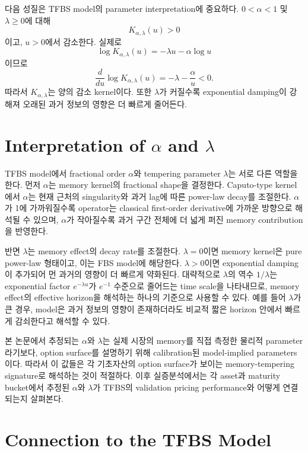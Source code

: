 \documentclass[11pt,a4paper]{report}
\begin{document}
다음 성질은 TFBS model의 parameter interpretation에 중요하다. $0<\alpha<1$ 및 $\lambda\ge0$에 대해
\[
K_{\alpha,\lambda}(u)>0
\]
이고, $u>0$에서 감소한다. 실제로
\[
\log K_{\alpha,\lambda}(u)
=
-\lambda u-\alpha\log u
\]
이므로
\[
\frac{d}{du}\log K_{\alpha,\lambda}(u)
=
-\lambda-\frac{\alpha}{u}<0.
\]
따라서 $K_{\alpha,\lambda}$는 양의 감소 kernel이다. 또한 $\lambda$가 커질수록 exponential damping이 강해져 오래된 과거 정보의 영향은 더 빠르게 줄어든다.

\section{Interpretation of \texorpdfstring{$\alpha$}{alpha} and \texorpdfstring{$\lambda$}{lambda}}

TFBS model에서 fractional order $\alpha$와 tempering parameter $\lambda$는 서로 다른 역할을 한다. 먼저 $\alpha$는 memory kernel의 fractional shape을 결정한다. Caputo-type kernel에서 $\alpha$는 현재 근처의 singularity와 과거 lag에 따른 power-law decay를 조절한다. $\alpha$가 1에 가까워질수록 operator는 classical first-order derivative에 가까운 방향으로 해석될 수 있으며, $\alpha$가 작아질수록 과거 구간 전체에 더 넓게 퍼진 memory contribution을 반영한다.

반면 $\lambda$는 memory effect의 decay rate를 조절한다. $\lambda=0$이면 memory kernel은 pure power-law 형태이고, 이는 FBS model에 해당한다. $\lambda>0$이면 exponential damping이 추가되어 먼 과거의 영향이 더 빠르게 약화된다. 대략적으로 $\lambda$의 역수 $1/\lambda$는 exponential factor $e^{-\lambda u}$가 $e^{-1}$ 수준으로 줄어드는 time scale을 나타내므로, memory effect의 effective horizon을 해석하는 하나의 기준으로 사용할 수 있다. 예를 들어 $\lambda$가 큰 경우, model은 과거 정보의 영향이 존재하더라도 비교적 짧은 horizon 안에서 빠르게 감쇠한다고 해석할 수 있다.

본 논문에서 추정되는 $\alpha$와 $\lambda$는 실제 시장의 memory를 직접 측정한 물리적 parameter라기보다, option surface를 설명하기 위해 calibration된 model-implied parameters이다. 따라서 이 값들은 각 기초자산의 option surface가 보이는 memory-tempering signature로 해석하는 것이 적절하다. 이후 실증분석에서는 각 asset과 maturity bucket에서 추정된 $\alpha$와 $\lambda$가 TFBS의 validation pricing performance와 어떻게 연결되는지 살펴본다.

\section{Connection to the TFBS Model}
\end{document}
